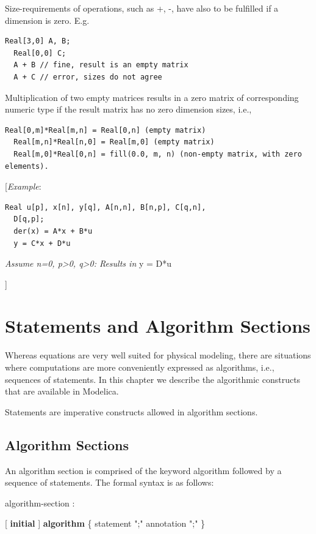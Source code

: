 \documentclass[10pt,a4paper]{report}
\def\doublelabel#1{\label{#1}}
\begin{document}
Size-requirements of operations, such as +, -, have also to be fulfilled
if a dimension is zero. E.g.

\begin{lstlisting}[language=modelica]
  Real[3,0] A, B;
  Real[0,0] C;
  A + B // fine, result is an empty matrix
  A + C // error, sizes do not agree
\end{lstlisting}
Multiplication of two empty matrices results in a zero matrix of
corresponding numeric type if the result matrix has no zero dimension
sizes, i.e.,

\begin{lstlisting}[language=modelica]
  Real[0,m]*Real[m,n] = Real[0,n] (empty matrix)
  Real[m,n]*Real[n,0] = Real[m,0] (empty matrix)
  Real[m,0]*Real[0,n] = fill(0.0, m, n) (non-empty matrix, with zero elements).
\end{lstlisting}
{[}\emph{Example}:

\begin{lstlisting}[language=modelica]
  Real u[p], x[n], y[q], A[n,n], B[n,p], C[q,n],
  D[q,p];
  der(x) = A*x + B*u
  y = C*x + D*u
\end{lstlisting}
\emph{Assume n=0, p\textgreater{}0, q\textgreater{}0: Results in} y =
D*u

{]}

\chapter{Statements and Algorithm Sections}\doublelabel{statements-and-algorithm-sections}

Whereas equations are very well suited for physical modeling, there are
situations where computations are more conveniently expressed as
algorithms, i.e., sequences of statements. In this chapter we describe
the algorithmic constructs that are available in Modelica.

Statements are imperative constructs allowed in algorithm sections.

\section{Algorithm Sections}\doublelabel{algorithm-sections}

An algorithm section is comprised of the keyword algorithm followed by a
sequence of statements. The formal syntax is as follows:

algorithm-section :

{[} \textbf{initial} {]} \textbf{algorithm} \{ statement ";" \textbar{}
annotation ";" \}
\end{document}
